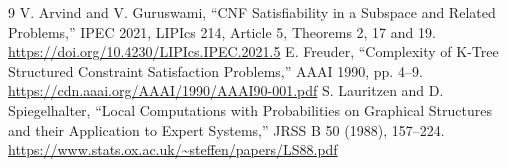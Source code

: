 \documentclass[11pt]{article}
\begin{document}
\begin{thebibliography}{9}
 V. Arvind and V. Guruswami,
``CNF Satisfiability in a Subspace and Related Problems,'' IPEC 2021,
LIPIcs 214, Article 5, Theorems 2, 17 and 19.
\url{https://doi.org/10.4230/LIPIcs.IPEC.2021.5}
 E. Freuder, ``Complexity of K-Tree Structured Constraint
Satisfaction Problems,'' AAAI 1990, pp. 4--9.
\url{https://cdn.aaai.org/AAAI/1990/AAAI90-001.pdf}
 S. Lauritzen and D. Spiegelhalter,
``Local Computations with Probabilities on Graphical Structures and their
Application to Expert Systems,'' JRSS B 50 (1988), 157--224.
\url{https://www.stats.ox.ac.uk/~steffen/papers/LS88.pdf}
\end{thebibliography}

\end{document}
